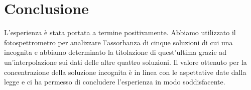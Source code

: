 \section*{Conclusione}

L'esperienza è stata portata a termine positivamente. Abbiamo utilizzato il fotospettrometro per analizzare l'assorbanza di cinque soluzioni di cui una incognita e abbiamo determinato la titolazione di quest'ultima grazie ad un'interpolazione sui dati delle altre quattro soluzioni.
Il valore ottenuto per la concentrazione della soluzione incognita è in linea con le aspettative date dalla legge e ci ha permesso di concludere l'esperienza in modo soddisfacente.